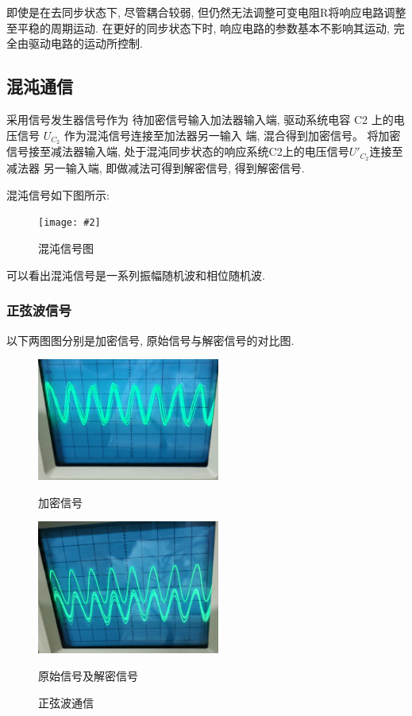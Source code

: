 \documentclass[12pt,a4paper]{article}
\newcommand{\bfig}[3]{
    \begin{figure}[H]
        \centering
        \texttt{[image: \#2]}
        \caption{#3}
    \end{figure}
}
\begin{document}
即使是在去同步状态下, 尽管耦合较弱, 但仍然无法调整可变电阻R将响应电路调整至平稳的周期运动. 在更好的同步状态下时, 响应电路的参数基本不影响其运动, 完全由驱动电路的运动所控制. 

\subsection{混沌通信}
采用信号发生器信号作为
待加密信号输入加法器输入端, 驱动系统电容 C2 上的电压信号 $U_{C_2}$ 作为混沌信号连接至加法器另一输入
端, 混合得到加密信号。
将加密信号接至减法器输入端, 处于混沌同步状态的响应系统C2上的电压信号$U'_{C_2}$连接至减法器
另一输入端, 即做减法可得到解密信号, 得到解密信号. 

混沌信号如下图所示: 
\bfig{0.5}{混沌信号.jpg}{混沌信号图}
可以看出混沌信号是一系列振幅随机波和相位随机波. 

\subsubsection{正弦波信号}
以下两图图分别是加密信号, 原始信号与解密信号的对比图. 


\begin{figure}[H]
    \centering
    \begin{minipage}[t]{0.48\textwidth}
    \centering
    \includegraphics[width=6cm]{sin加密信号.jpg}
    \caption{加密信号}
    \end{minipage}
    \begin{minipage}[t]{0.48\textwidth}
    \centering
    \includegraphics[width=6cm]{sin原始信号与解密信号对比.jpg}
    \caption{原始信号及解密信号}
    \end{minipage}
    \caption{正弦波通信}
    \end{figure}
    
\end{document}

